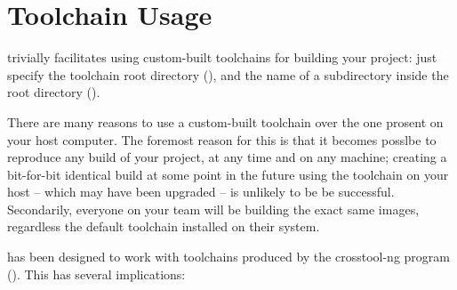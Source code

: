 %
%
%
%
\chapter{Toolchain Usage}\label{chap:toolchain-usage}

\lmsbw trivially facilitates using custom-built toolchains for
building your project: just specify the toolchain root directory
(), and the name of a subdirectory
inside the root directory ().

There are many reasons to use a custom-built toolchain over the one
prosent on your host computer.  The foremost reason for this is that
it becomes posslbe to reproduce any build of your project, at any time
and on any machine; creating a bit-for-bit identical build at some
point in the future using the toolchain on your host -- which may have
been upgraded -- is unlikely to be be successful.  Secondarily,
everyone on your team will be building the exact same images,
regardless the default toolchain installed on their system.

\lmsbw has been designed to work with toolchains produced by the
crosstool-ng program ().  This has
several implications:


